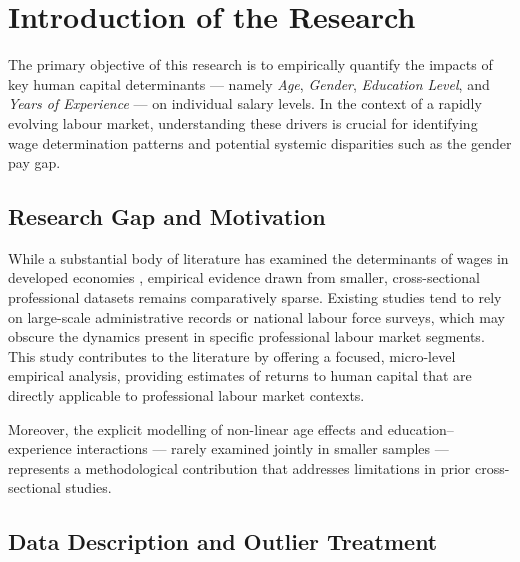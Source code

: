 \documentclass[12pt, a4paper]{article}
\begin{document}
\clearpage
{}
\setcounter{page}{1}

\onehalfspacing
\tableofcontents
\newpage

\section{Introduction of the Research}

The primary objective of this research is to empirically quantify the impacts of key
human capital determinants — namely \textit{Age}, \textit{Gender}, \textit{Education Level},
and \textit{Years of Experience} — on individual salary levels. In the context of a rapidly
evolving labour market, understanding these drivers is crucial for identifying wage
determination patterns and potential systemic disparities such as the gender pay gap.

\subsection{Research Gap and Motivation}

While a substantial body of literature has examined the determinants of wages in
developed economies \citep{mincer1974, card1999, lemieux2006}, empirical evidence drawn
from smaller, cross-sectional professional datasets remains comparatively sparse.
Existing studies tend to rely on large-scale administrative records or national labour
force surveys, which may obscure the dynamics present in specific professional labour
market segments. This study contributes to the literature by offering a focused,
micro-level empirical analysis, providing estimates of returns to human capital that are
directly applicable to professional labour market contexts.

Moreover, the explicit modelling of non-linear age effects and education--experience
interactions — rarely examined jointly in smaller samples — represents a methodological
contribution that addresses limitations in prior cross-sectional studies.

\subsection{Data Description and Outlier Treatment}
\end{document}
